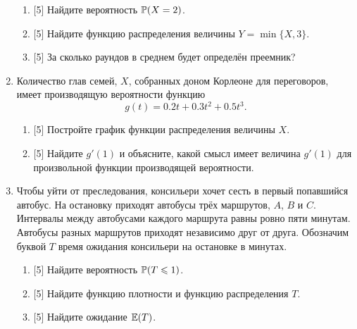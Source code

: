 \begin{enumerate}
  \begin{enumerate}
      \item {[5]} Найдите вероятность $\P(X = 2)$. 
      \item {[5]} Найдите функцию распределения величины $Y = \min\{X, 3\}$.
      \item {[5]} За сколько раундов в среднем будет определён преемник?
  \end{enumerate}
  

  \item Количество глав семей, $X$, собранных доном Корлеоне для переговоров, имеет производящую вероятности функцию 
  \[
  g(t) = 0.2 t + 0.3 t^2 + 0.5 t^3.    
  \]
  \begin{enumerate}
      \item {[5]} Постройте график функции распределения величины $X$. 
      \item {[5]} Найдите $g'(1)$ и объясните, какой смысл имеет величина $g'(1)$ для произвольной функции производящей вероятности.
  \end{enumerate}
  
  \item Чтобы уйти от преследования, консильери хочет сесть в первый попавшийся автобус. 
  На остановку приходят автобусы трёх маршрутов, $A$, $B$ и $C$. 
  Интервалы между автобусами каждого маршрута равны ровно пяти минутам. 
  Автобусы разных маршрутов приходят независимо друг от друга. 
  Обозначим буквой $T$ время ожидания консильери на остановке в минутах.
  
  \begin{enumerate}
      \item {[5]} Найдите вероятность $\P(T \leq 1)$.
      \item {[5]} Найдите функцию плотности и функцию распределения $T$.
      \item {[5]} Найдите ожидание $\E(T)$.
  \end{enumerate}
  
  
  
  
\end{enumerate}
  
